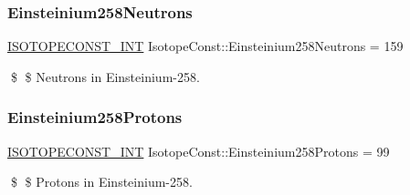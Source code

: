 \subsubsection{\texorpdfstring{Einsteinium258\+Neutrons}{Einsteinium258Neutrons}}
{\footnotesize\ttfamily \mbox{\hyperlink{group___isotope_const-_macros_ga5f18360b3e99483a35c32d789e62621c}{I\+S\+O\+T\+O\+P\+E\+C\+O\+N\+S\+T\+\_\+\+I\+NT}} Isotope\+Const\+::\+Einsteinium258\+Neutrons = 159}

\$ \$ Neutrons in Einsteinium-\/258. \mbox{\label{group___isotope_const-_einsteinium-_es258_gaab293879b565a9778c7bc315d3bbe5f8}} 
\subsubsection{\texorpdfstring{Einsteinium258\+Protons}{Einsteinium258Protons}}
{\footnotesize\ttfamily \mbox{\hyperlink{group___isotope_const-_macros_ga5f18360b3e99483a35c32d789e62621c}{I\+S\+O\+T\+O\+P\+E\+C\+O\+N\+S\+T\+\_\+\+I\+NT}} Isotope\+Const\+::\+Einsteinium258\+Protons = 99}

\$ \$ Protons in Einsteinium-\/258. 